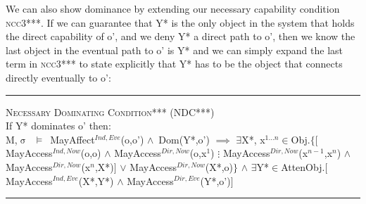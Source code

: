 \documentclass[a4paper,11pt, twoside,twocolumn]{article}
\newenvironment{logic}[1][]
{\begin{flushleft} \small }
{\end{flushleft}}
\newcommand{\loin}{$\in$}
\newcommand{\loexists}{$\exists$}
\newcommand{\loand}{$\land$}
\newcommand{\loor} {$\lor$}
\newcommand{\loimplies}{$\implies$}
\newcommand{\losigma}{$\upsigma$}
\newcommand{\loturns} {$\vDash$}
\newcommand{\ablock} {\null\qquad}
\begin{document}
We can also show dominance by extending our necessary capability condition \textsc{ncc3***}. If we can guarantee that Y* is the only object in the system that holds the direct capability of o', and we deny Y* a direct path to o', then we know the last object in the eventual path to o' is Y* and we can simply expand the last term in \textsc{ncc3***} to state explicitly that Y* has to be the object that connects directly eventually to o':
\begin{minipage}{\linewidth}
\begin{logic}
\hrule\null
\textsc{\normalsize *Necessary Dominating Condition*** (NDC***)}\\
If Y* dominates o' then:\\
M,\losigma\ \loturns\ MayAffect$^{Ind,Eve}$(o,o') \loand\ Dom(Y*,o')\linebreak
\ablock \loimplies\linebreak
\ablock \loexists X*, x$^{1...n}$\loin Obj.$\{[$MayAccess$^{Ind,Now}$(o,o)\linebreak
\ablock \ablock \ablock \ablock \ablock \loand\linebreak
\ablock \ablock \ablock \ablock \ablock MayAccess$^{Dir,Now}$(o,x$^1$)\linebreak
\ablock \ablock \ablock \ablock \ablock $\vdots$\linebreak
\ablock \ablock \ablock \ablock \ablock MayAccess$^{Dir,Now}$(x$^{n-1}$,x$^n$)\linebreak
\ablock \ablock \ablock \ablock \ablock \loand\linebreak
\ablock \ablock \ablock \ablock \ablock MayAccess$^{Dir,Now}$(x$^n$,X*)$]$\linebreak
\ablock \ablock \ablock \ablock \quad\: \loor \linebreak
\ablock \ablock \ablock \ablock \quad\: MayAccess$^{Dir,Now}$(X*,o)$\}$\linebreak
\ablock \ablock \ablock \ablock \loand \linebreak
\ablock \ablock \loexists Y*\loin{AttenObj}.$[$MayAccess$^{Ind,Eve}$(X*,Y*) \loand\linebreak
\ablock \ablock \ablock \ablock \ablock \quad MayAccess$^{Dir,Eve}$(Y*,o')$]$
\linebreak\\
\hrule
\end{logic}
\end{minipage}\linebreak\\
\end{document}
